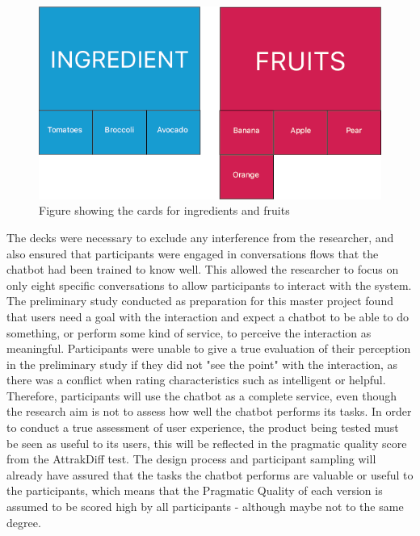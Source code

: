      \begin{figure}[h]
            \centering
            \includegraphics[scale=0.5]{figures/Ingredientfruit.png}
            \caption{Figure showing the cards for ingredients and fruits}
            \label{fig:ingfruit}
        \end{figure}

   The decks were necessary to exclude any interference from the researcher, and also ensured that participants were engaged in conversations flows that the chatbot had been trained to know well. This allowed the researcher to focus on only eight specific conversations to allow participants to interact with the system. The preliminary study conducted as preparation for this master project found that users need a goal with the interaction and expect a chatbot to be able to do something, or perform some kind of service, to perceive the interaction as meaningful. Participants were unable to give a true evaluation of their perception in the preliminary study if they did not "see the point" with the interaction, as there was a conflict when rating characteristics such as intelligent or helpful. Therefore, participants will use the chatbot as a complete service, even though the research aim is not to assess how well the chatbot performs its tasks. In order to conduct a true assessment of user experience, the product being tested must be seen as useful to its users, this will be reflected in the pragmatic quality score from the AttrakDiff test. The design process and participant sampling will already have assured that the tasks the chatbot performs are valuable or useful to the participants, which means that the Pragmatic Quality of each version is assumed to be scored high by all participants - although maybe not to the same degree.
   

